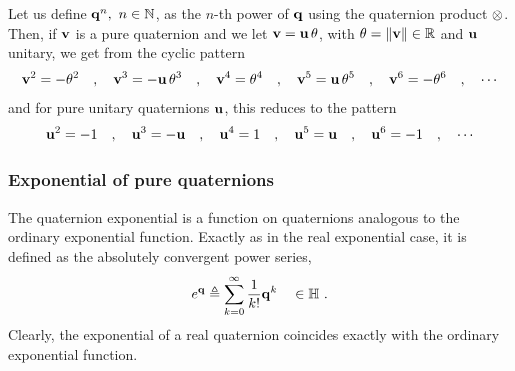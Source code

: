 Let us define ${\bf q}^n, ~n\in{\mathbb N}$, as the $n$-th power of ${\bf q}$ using the quaternion product $\otimes$. 
Then, if ${\bf v}$ is a pure quaternion and we let ${\bf v}={\bf u}\,\theta$, with $\theta={\left\|{\bf v}\right\|}\in{\mathbb R}$ and ${\bf u}$ unitary, we get from  the cyclic pattern
%
\begin{align}
{\bf v}^2 = -\theta^2 \quad,\quad
{\bf v}^3 = -{\bf u}\,\theta^3 \quad,\quad
{\bf v}^4 = \theta^4 \quad,\quad
{\bf v}^5 = {\bf u}\,\theta^5 \quad,\quad
{\bf v}^6 = -\theta^6 \quad,\quad
\cdots
\label{equ:qvPowers}
\end{align}
%
and for pure unitary quaternions ${\bf u}$, this reduces to the pattern
%
\begin{align}
{\bf u}^2 = -1 	\quad,\quad
{\bf u}^3 = -{\bf u} 	\quad,\quad
{\bf u}^4 = 1 		\quad,\quad
{\bf u}^5 = {\bf u} 	\quad,\quad
{\bf u}^6 = -1 	\quad,\quad
\cdots
\label{equ:uPowers}
\end{align}




\subsubsection{Exponential of pure quaternions}

The quaternion exponential is a function on quaternions analogous to the ordinary exponential function. 
Exactly as in the real exponential case, it is defined as the absolutely convergent power series,
%
\begin{align}
e^{\bf q}
\triangleq \sum_{k=0}^\infty \frac{1}{k!}{\bf q}^k \quad \in {\mathbb H}
~.
\label{equ:quatExpSeries}
\end{align}
%
Clearly, the exponential of  a real quaternion coincides exactly with the ordinary exponential function. 

